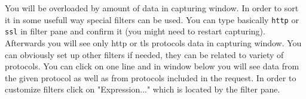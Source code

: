 You will be overloaded by amount of data in capturing window.
In order to sort it in some usefull way special filters can be used.
You can type basically \texttt{http} or \texttt{ssl} in filter pane and confirm it (you might need to restart capturing).
Afterwards you will see only http or tls protocols data in capturing window.
You can obviously set up other filters if needed, they can be related to variety of protocols.
You can click on one line and in window below you will see data from the given protocol as well as from protocols included in the request.
In order to customize filters click on "Expression..." which is located by the filter pane.
